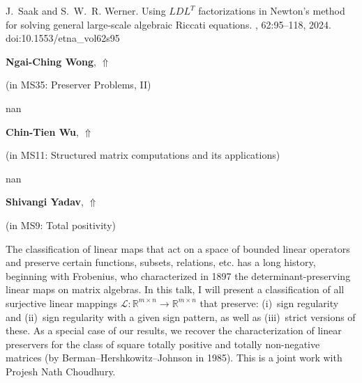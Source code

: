 \documentclass[ILAS2025-program.tex]{subfiles}
\begin{document}
\begin{ilasabstract}
\begin{bibunit}
\begin{thebibliography}{10}
J.~Saak and S.~W.~R. Werner.
\newblock Using {$LDL^{T}$} factorizations in {N}ewton's method for solving
  general large-scale algebraic {R}iccati equations.
, 62:95--118, 2024.
\newblock doi:10.1553/etna\_vol62s95
\end{thebibliography}

        \end{bibunit}
        \end{ilasabstract}
     \hypertarget{down0317}{}\begin{ilasabstract}
    
    \textbf{Ngai-Ching Wong},  \hfill \hyperlink{up0317}{$\Uparrow$}
    
    (in {\color{mstitle}MS35: Preserver Problems, II})
        
        \mtskip
    nan\end{ilasabstract}
     \hypertarget{down0233}{}\begin{ilasabstract}
    
    \textbf{Chin-Tien Wu},  \hfill \hyperlink{up0233}{$\Uparrow$}
    
    (in {\color{mstitle}MS11: Structured matrix computations and its applications})
        
        \mtskip
    nan\end{ilasabstract}
     \hypertarget{down0011}{}\begin{ilasabstract}
    
    \textbf{Shivangi Yadav},  \hfill \hyperlink{up0011}{$\Uparrow$}
    
    (in {\color{mstitle}MS9: Total positivity})
        
        \mtskip
    The classification of linear maps that act on a space of bounded linear operators and preserve certain functions, subsets, relations, etc. has a long history, beginning with Frobenius, who characterized in 1897 the  determinant-preserving linear maps on matrix algebras. In this talk, I will present a classification of all surjective linear mappings $\mathcal{L}:\mathbb{R}^{m\times n}\to\mathbb{R}^{m\times n}$ that preserve: (i)~sign regularity and (ii)~sign regularity with a given sign pattern, as well as (iii)~strict versions of these. As a special case of our results, we recover the characterization of linear preservers for the class of square totally positive and totally non-negative matrices (by Berman--Hershkowitz--Johnson in 1985). This is a joint work with Projesh Nath Choudhury.
\end{ilasabstract}
\end{document}
